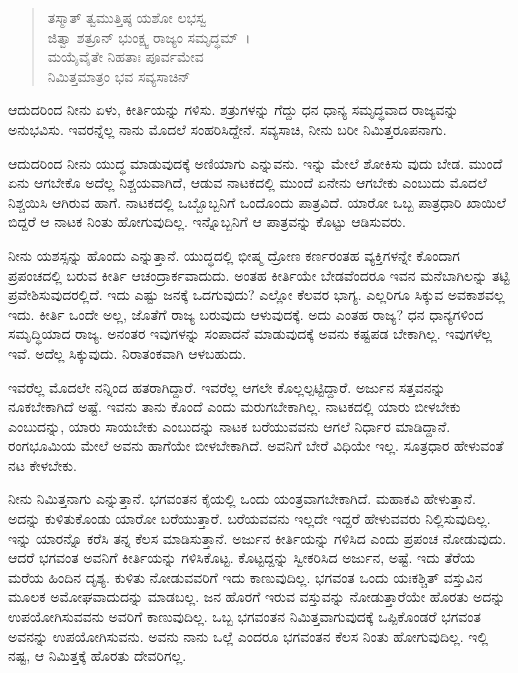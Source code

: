 \begin{verse}
ತಸ್ಮಾತ್ ತ್ವಮುತ್ತಿಷ್ಠ ಯಶೋ ಲಭಸ್ವ\\ ಜಿತ್ವಾ ಶತ್ರೂನ್ ಭುಂಕ್ಷ್ವ ರಾಜ್ಯಂ ಸಮೃದ್ಧಮ್~।\\ಮಯೈವೈತೇ ನಿಹತಾಃ ಪೂರ್ವಮೇವ\\ ನಿಮಿತ್ತಮಾತ್ರಂ ಭವ ಸವ್ಯಸಾಚಿನ್ 
\end{verse}

{\small ಆದುದರಿಂದ ನೀನು ಏಳು, ಕೀರ್ತಿಯನ್ನು ಗಳಿಸು. ಶತ್ರುಗಳನ್ನು ಗೆದ್ದು ಧನ ಧಾನ್ಯ ಸಮೃದ್ಧವಾದ ರಾಜ್ಯವನ್ನು ಅನುಭವಿಸು. ಇವರನ್ನೆಲ್ಲ ನಾನು ಮೊದಲೆ ಸಂಹರಿಸಿದ್ದೇನೆ. ಸವ್ಯಸಾಚಿ, ನೀನು ಬರೀ ನಿಮಿತ್ತರೂಪನಾಗು.}

ಆದುದರಿಂದ ನೀನು ಯುದ್ಧ ಮಾಡುವುದಕ್ಕೆ ಅಣಿಯಾಗು ಎನ್ನುವನು. ಇನ್ನು ಮೇಲೆ ಶೋಕಿಸು ವುದು ಬೇಡ. ಮುಂದೆ ಏನು ಆಗಬೇಕೊ ಅದೆಲ್ಲ ನಿಶ್ಚಯವಾಗಿದೆ, ಆಡುವ ನಾಟಕದಲ್ಲಿ ಮುಂದೆ ಏನೇನು ಆಗಬೇಕು ಎಂಬುದು ಮೊದಲೆ ನಿಶ್ಚಯಿಸಿ ಆಗಿರುವ ಹಾಗೆ. ನಾಟಕದಲ್ಲಿ ಒಬ್ಬೊಬ್ಬನಿಗೆ ಒಂದೊಂದು ಪಾತ್ರವಿದೆ. ಯಾರೋ ಒಬ್ಬ ಪಾತ್ರಧಾರಿ ಖಾಯಿಲೆ ಬಿದ್ದರೆ ಆ ನಾಟಕ ನಿಂತು ಹೋಗುವುದಿಲ್ಲ. ಇನ್ನೊಬ್ಬನಿಗೆ ಆ ಪಾತ್ರವನ್ನು ಕೊಟ್ಟು ಆಡಿಸುವರು.

ನೀನು ಯಶಸ್ಸನ್ನು ಹೊಂದು ಎನ್ನುತ್ತಾನೆ. ಯುದ್ಧದಲ್ಲಿ ಭೀಷ್ಮ ದ್ರೋಣ ಕರ್ಣರಂತಹ ವ್ಯಕ್ತಿಗಳನ್ನೇ ಕೊಂದಾಗ ಪ್ರಪಂಚದಲ್ಲಿ ಬರುವ ಕೀರ್ತಿ ಆಚಂದ್ರಾರ್ಕವಾದುದು. ಅಂತಹ ಕೀರ್ತಿಯೇ ಬೇಡವೆಂದರೂ ಇವನ ಮನೆಬಾಗಿಲನ್ನು ತಟ್ಟಿ ಪ್ರವೇಶಿಸುವುದರಲ್ಲಿದೆ. ಇದು ಎಷ್ಟು ಜನಕ್ಕೆ ಒದಗುವುದು? ಎಲ್ಲೋ ಕೆಲವರ ಭಾಗ್ಯ. ಎಲ್ಲರಿಗೂ ಸಿಕ್ಕುವ ಅವಕಾಶವಲ್ಲ ಇದು. ಕೀರ್ತಿ ಒಂದೇ ಅಲ್ಲ, ಜೊತೆಗೆ ರಾಜ್ಯ ಬರುವುದು ಆಳುವುದಕ್ಕೆ. ಅದು ಎಂತಹ ರಾಜ್ಯ? ಧನ ಧಾನ್ಯಗಳಿಂದ ಸಮೃದ್ಧಿಯಾದ ರಾಜ್ಯ. ಅನಂತರ ಇವುಗಳನ್ನು ಸಂಪಾದನೆ ಮಾಡುವುದಕ್ಕೆ ಅವನು ಕಷ್ಟಪಡ ಬೇಕಾಗಿಲ್ಲ. ಇವುಗಳೆಲ್ಲ ಇವೆ. ಅದೆಲ್ಲ ಸಿಕ್ಕುವುದು. ನಿರಾತಂಕವಾಗಿ ಆಳಬಹುದು.

ಇವರೆಲ್ಲ ಮೊದಲೇ ನನ್ನಿಂದ ಹತರಾಗಿದ್ದಾರೆ. ಇವರೆಲ್ಲ ಆಗಲೇ ಕೊಲ್ಲಲ್ಪಟ್ಟಿದ್ದಾರೆ. ಅರ್ಜುನ ಸತ್ತವನನ್ನು ನೂಕಬೇಕಾಗಿದೆ ಅಷ್ಟೆ. ಇವನು ತಾನು ಕೊಂದೆ ಎಂದು ಮರುಗಬೇಕಾಗಿಲ್ಲ. ನಾಟಕದಲ್ಲಿ ಯಾರು ಬೀಳಬೇಕು ಎಂಬುದನ್ನು, ಯಾರು ಸಾಯಬೇಕು ಎಂಬುದನ್ನು ನಾಟಕ ಬರೆಯುವವನು ಆಗಲೆ ನಿರ್ಧಾರ ಮಾಡಿದ್ದಾನೆ. ರಂಗಭೂಮಿಯ ಮೇಲೆ ಅವನು ಹಾಗೆಯೇ ಬೀಳಬೇಕಾಗಿದೆ. ಅವನಿಗೆ ಬೇರೆ ವಿಧಿಯೇ ಇಲ್ಲ. ಸೂತ್ರಧಾರ ಹೇಳುವಂತೆ ನಟ ಕೇಳಬೇಕು.

ನೀನು ನಿಮಿತ್ತನಾಗು ಎನ್ನುತ್ತಾನೆ. ಭಗವಂತನ ಕೈಯಲ್ಲಿ ಒಂದು ಯಂತ್ರವಾಗಬೇಕಾಗಿದೆ. ಮಹಾಕವಿ ಹೇಳುತ್ತಾನೆ. ಅದನ್ನು ಕುಳಿತುಕೊಂಡು ಯಾರೋ ಬರೆಯುತ್ತಾರೆ. ಬರೆಯವವನು ಇಲ್ಲದೇ ಇದ್ದರೆ ಹೇಳುವವರು ನಿಲ್ಲಿಸುವುದಿಲ್ಲ. ಇನ್ನು ಯಾರನ್ನೊ ಕರೆಸಿ ತನ್ನ ಕೆಲಸ ಮಾಡಿಸುತ್ತಾನೆ. ಅರ್ಜುನ ಕೀರ್ತಿಯನ್ನು ಗಳಿಸಿದ ಎಂದು ಪ್ರಪಂಚ ನೋಡುವುದು. ಆದರೆ ಭಗವಂತ ಅವನಿಗೆ ಕೀರ್ತಿಯನ್ನು ಗಳಿಸಿಕೊಟ್ಟ. ಕೊಟ್ಟದ್ದನ್ನು ಸ್ವೀಕರಿಸಿದ ಅರ್ಜುನ, ಅಷ್ಟೆ. ಇದು ತೆರೆಯ ಮರೆಯ ಹಿಂದಿನ ದೃಶ್ಯ. ಕುಳಿತು ನೋಡುವವರಿಗೆ ಇದು ಕಾಣುವುದಿಲ್ಲ. ಭಗವಂತ ಒಂದು ಯಃಕಶ್ಚಿತ್ ವಸ್ತುವಿನ ಮೂಲಕ ಅಮೋಘವಾದುದನ್ನು ಮಾಡಬಲ್ಲ. ಜನ ಹೊರಗೆ ಇರುವ ವಸ್ತುವನ್ನು ನೋಡುತ್ತಾರೆಯೇ ಹೊರತು ಅದನ್ನು ಉಪಯೋಗಿಸುವವನು ಅವರಿಗೆ ಕಾಣುವುದಿಲ್ಲ. ಒಬ್ಬ ಭಗವಂತನ ನಿಮಿತ್ತವಾಗುವುದಕ್ಕೆ ಒಪ್ಪಿಕೊಂಡರೆ ಭಗವಂತ ಅವನನ್ನು ಉಪಯೋಗಿಸುವನು. ಅವನು ನಾನು ಒಲ್ಲೆ ಎಂದರೂ ಭಗವಂತನ ಕೆಲಸ ನಿಂತು ಹೋಗುವುದಿಲ್ಲ. ಇಲ್ಲಿ ನಷ್ಟ, ಆ ನಿಮಿತ್ತಕ್ಕೆ ಹೊರತು ದೇವರಿಗಲ್ಲ.

